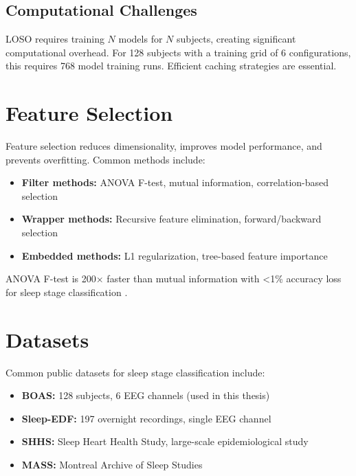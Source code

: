 \subsection{Computational Challenges}
\label{subsec:computational_challenges}

LOSO requires training $N$ models for $N$ subjects, creating significant computational overhead. For 128 subjects with a training grid of 6 configurations, this requires 768 model training runs. Efficient caching strategies are essential.


\section{Feature Selection}
\label{sec:feature_selection}

Feature selection reduces dimensionality, improves model performance, and prevents overfitting. Common methods include:

\begin{itemize}
    \item \textbf{Filter methods:} ANOVA F-test, mutual information, correlation-based selection
    \item \textbf{Wrapper methods:} Recursive feature elimination, forward/backward selection
    \item \textbf{Embedded methods:} L1 regularization, tree-based feature importance
\end{itemize}

ANOVA F-test is 200$\times$ faster than mutual information with <1\% accuracy loss for sleep stage classification \cite{TODO_ADD_BENCHMARK_REF}.

\section{Datasets}
\label{sec:datasets}

Common public datasets for sleep stage classification include:

\begin{itemize}
    \item \textbf{BOAS:} 128 subjects, 6 EEG channels (used in this thesis)
    \item \textbf{Sleep-EDF:} 197 overnight recordings, single EEG channel
    \item \textbf{SHHS:} Sleep Heart Health Study, large-scale epidemiological study
    \item \textbf{MASS:} Montreal Archive of Sleep Studies
\end{itemize}

